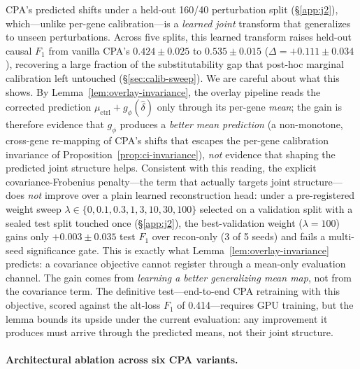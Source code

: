 \documentclass{article}
\theoremstyle{plain}
\theoremstyle{definition}
\theoremstyle{remark}
\begin{document}
CPA's predicted shifts under a held-out 160/40 perturbation split (\S\ref{app:j2}), which---unlike per-gene calibration---is a \emph{learned joint} transform that generalizes to unseen perturbations. Across five splits, this learned transform raises held-out causal $F_1$ from vanilla CPA's $0.424 \pm 0.025$ to $0.535 \pm 0.015$ ($\Delta = +0.111 \pm 0.034$), recovering a large fraction of the substitutability gap that post-hoc marginal calibration left untouched (\S\ref{sec:calib-sweep}). We are careful about what this shows. By Lemma~\ref{lem:overlay-invariance}, the overlay pipeline reads the corrected prediction $\mu_{\text{ctrl}}+g_\phi(\hat\delta)$ only through its per-gene \emph{mean}; the gain is therefore evidence that $g_\phi$ produces a \emph{better mean prediction} (a non-monotone, cross-gene re-mapping of CPA's shifts that escapes the per-gene calibration invariance of Proposition~\ref{prop:ci-invariance}), \emph{not} evidence that shaping the predicted joint structure helps. Consistent with this reading, the explicit covariance-Frobenius penalty---the term that actually targets joint structure---does \emph{not} improve over a plain learned reconstruction head: under a pre-registered weight sweep $\lambda\in\{0,0.1,0.3,1,3,10,30,100\}$ selected on a validation split with a sealed test split touched once (\S\ref{app:j2}), the best-validation weight ($\lambda{=}100$) gains only $+0.003 \pm 0.035$ test $F_1$ over recon-only (3 of 5 seeds) and fails a multi-seed significance gate. This is exactly what Lemma~\ref{lem:overlay-invariance} predicts: a covariance objective cannot register through a mean-only evaluation channel. The gain comes from \emph{learning a better generalizing mean map}, not from the covariance term. The definitive test---end-to-end CPA retraining with this objective, scored against the alt-loss $F_1$ of 0.414---requires GPU training, but the lemma bounds its upside under the current evaluation: any improvement it produces must arrive through the predicted means, not their joint structure.

\paragraph{Architectural ablation across six CPA variants.}
\end{document}
